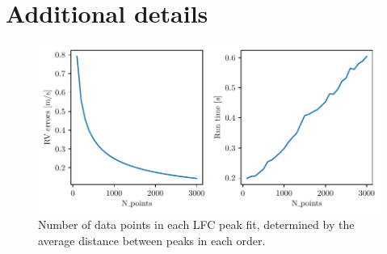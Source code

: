 

% 
% 





% 
% 
\newpage
\section{Additional details}\label{appendix:RV_extraction}

\begin{figure}%
    \begin{wide}  
    \includegraphics[scale=0.72]{figures/err_vs_run_time.pdf}
    \caption{Number of data points in each LFC peak fit, determined by the average distance between peaks in each order.}
    \label{fig:err_vs_run_time}
\end{wide}
\end{figure}

